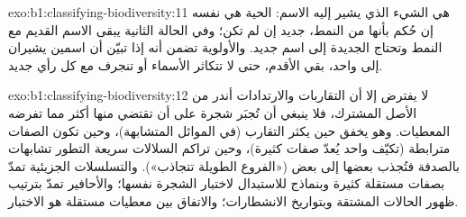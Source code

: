 \begin{solution}{exo:b1:classifying-biodiversity:11}
 هي الشيء الذي يشير إليه الاسم: 
الحية هي  نفسه إن حُكم بأنها من 
النمط،  جديد إن لم تكن؛ وفي الحالة الثانية يبقى الاسم القديم
مع النمط وتحتاج  الجديدة إلى اسم جديد. والأولوية
تضمن أنه إذا تبيّن أن اسمين يشيران إلى  واحد، بقي
الأقدم، حتى لا تتكاثر الأسماء أو تنجرف مع كل رأي
جديد.
\end{solution}

\begin{solution}{exo:b1:classifying-biodiversity:12}
لا يفترض  إلا أن التقاربات والارتدادات أندر
من الأصل المشترك، فلا ينبغي أن تُجبَر شجرة على أن تقتضي
منها أكثر مما تفرضه المعطيات. وهو يخفق حين يكثر التقارب
(في الموائل المتشابهة)، وحين تكون الصفات مترابطة (تكيّف واحد
يُعدّ صفات كثيرة)، وحين تراكم السلالات سريعة التطور تشابهات
بالصدفة فتُجذب بعضها إلى بعض («الفروع الطويلة تتجاذب»).
والتسلسلات الجزيئية تمدّ بصفات مستقلة كثيرة وبنماذج
للاستبدال لاختبار الشجرة نفسها؛ والأحافير تمدّ بترتيب
ظهور الحالات المشتقة وبتواريخ الانشطارات؛ والاتفاق
بين معطيات مستقلة هو الاختبار.
\end{solution}

